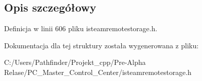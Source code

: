 \subsection{Opis szczegółowy}


Definicja w linii 606 pliku isteamremotestorage.\+h.



Dokumentacja dla tej struktury została wygenerowana z pliku\+:\begin{DoxyCompactItemize}
\item 
C\+:/\+Users/\+Pathfinder/\+Projekt\+\_\+cpp/\+Pre-\/\+Alpha Relase/\+P\+C\+\_\+\+Master\+\_\+\+Control\+\_\+\+Center/isteamremotestorage.\+h\end{DoxyCompactItemize}
